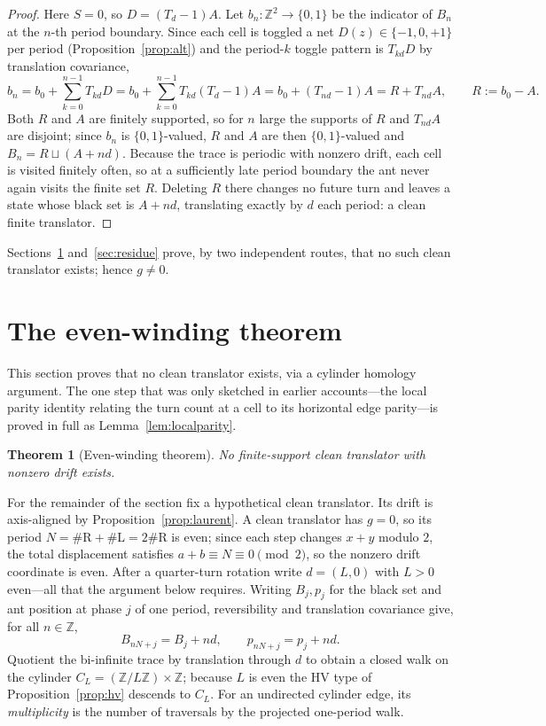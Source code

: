 \documentclass[11pt,reqno]{amsart}
\theoremstyle{plain}
\newtheorem{theorem}{Theorem}[section]
\theoremstyle{definition}
\newcommand{\Z}{\mathbb{Z}}
\newcommand{\drift}{d}
\newcommand{\growth}{g}
\newcommand{\turnR}{\mathrm{R}}
\newcommand{\turnL}{\mathrm{L}}
\begin{document}
\begin{proof}
Here $S=0$, so $D=(T_\drift-1)A$. Let $b_n:\Z^2\to\{0,1\}$ be the indicator of $B_n$
at the $n$-th period boundary. Since each cell is toggled a net $D(z)\in\{-1,0,+1\}$
per period (Proposition~\ref{prop:alt}) and the period-$k$ toggle pattern is
$T_{k\drift}D$ by translation covariance,
\[
b_n=b_0+\sum_{k=0}^{n-1}T_{k\drift}D
   =b_0+\sum_{k=0}^{n-1}T_{k\drift}(T_\drift-1)A
   =b_0+(T_{n\drift}-1)A=R+T_{n\drift}A,\qquad R:=b_0-A .
\]
Both $R$ and $A$ are finitely supported, so for $n$ large the supports of $R$ and
$T_{n\drift}A$ are disjoint; since $b_n$ is $\{0,1\}$-valued, $R$ and $A$ are then
$\{0,1\}$-valued and $B_n=R\sqcup(A+n\drift)$. Because the trace is periodic with
nonzero drift, each cell is visited finitely often, so at a sufficiently late period
boundary the ant never again visits the finite set $R$. Deleting $R$ there changes no
future turn and leaves a state whose black set is $A+n\drift$, translating exactly by
$\drift$ each period: a clean finite translator.
\end{proof}

Sections~\ref{sec:evenwinding} and~\ref{sec:residue} prove, by two independent
routes, that no such clean translator exists; hence $\growth\neq0$.

\section{The even-winding theorem}\label{sec:evenwinding}

This section proves that no clean translator exists, via a cylinder homology
argument. The one step that was only sketched in earlier accounts---the local
parity identity relating the turn count at a cell to its horizontal edge
parity---is proved in full as Lemma~\ref{lem:localparity}.

\begin{theorem}[Even-winding theorem]\label{thm:evenwinding}
No finite-support clean translator with nonzero drift exists.
\end{theorem}

For the remainder of the section fix a hypothetical clean translator. Its drift is
axis-aligned by Proposition~\ref{prop:laurent}. A clean translator has $\growth=0$, so
its period $N=\#\turnR+\#\turnL=2\#\turnR$ is even; since each step changes $x+y$
modulo $2$, the total displacement satisfies $a+b\equiv N\equiv0\pmod2$, so the
nonzero drift coordinate is even. After a quarter-turn rotation write $\drift=(L,0)$
with $L>0$ even---all that the argument below requires. Writing $B_j,p_j$ for the black
set and ant position at phase $j$ of one period, reversibility and translation
covariance give, for all $n\in\Z$,
\[
B_{nN+j}=B_j+n\drift,\qquad p_{nN+j}=p_j+n\drift .
\]
Quotient the bi-infinite trace by translation through $\drift$ to obtain a closed
walk on the cylinder $C_L=(\Z/L\Z)\times\Z$; because $L$ is even the HV type of
Proposition~\ref{prop:hv} descends to $C_L$. For an undirected cylinder edge, its
\emph{multiplicity} is the number of traversals by the projected one-period walk.
\end{document}
